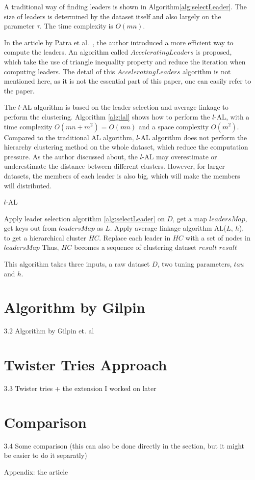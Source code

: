 \documentclass[utf8,english]{gradu3}
\begin{document}
A traditional way of finding leaders is shown in Algorithm\ref{alg:selectLeader}. The size of leaders is determined by the dataset itself and also largely on the parameter $\tau$. The time complexity is $O(mn)$.

In the article by Patra et al.~\cite{patra2010distance}, the author introduced a more efficient way to compute the leaders. An algorithm called $Accelerating Leaders$ is proposed, which take the use of triangle inequality property and reduce the iteration when computing leaders. The detail of this $Accelerating Leaders$ algorithm is not mentioned here, as it is not the essential part of this paper, one can easily refer to the paper.

The $l$-AL algorithm is based on the leader selection and average linkage to perform the clustering. 
Algorithm \ref*{alg:lal} shows how to perform the $l$-AL, with a time complexity $O(mn + m^2)$ = $O(mn)$ and a space complexity $O(m^2)$.
Compared to the traditional AL algorithm, $l$-AL algorithm does not perform the hierarchy clustering method on the whole dataset, which reduce the computation pressure. 
As the author discussed about, the $l$-AL may overestimate or underestimate the distance between different clusters.
However, for larger datasets, the members of each leader is also big, which will make the members will distributed.


\algrenewcommand\Return{\State \algorithmicreturn{} }
\begin{algorithm}[h]
	\caption{$l$-AL}
	\label{alg:lal}
	\begin{algorithmic}[1]
		\State Apply leader selection algorithm \ref{alg:selectLeader} on $D$, get a map $leadersMap$, get keys out from $leadersMap$ as $L$.
		\State Apply average linkage algorithm AL($L$, $h$), to get a hierarchical cluster $HC$.
		\State Replace each leader in $HC$ with a set of nodes in $leadersMap$
		\State Thus, $HC$ becomes a sequence of clustering dataset $result$
		\Return $result$
		\EndProcedure
		
		This algorithm takes three inputs, a raw dataset $D$, two tuning parameters, $tau$ and $h$.
	\end{algorithmic}
\end{algorithm}



\section{Algorithm by Gilpin}
3.2 Algorithm by Gilpin et. al

\section{Twister Tries Approach}
3.3 Twister tries + the extension I worked on later

\section{Comparison}
3.4 Some comparison (this can also be done directly in the section, but it might be easier to do it separatly)

Appendix: the article
\end{document}
